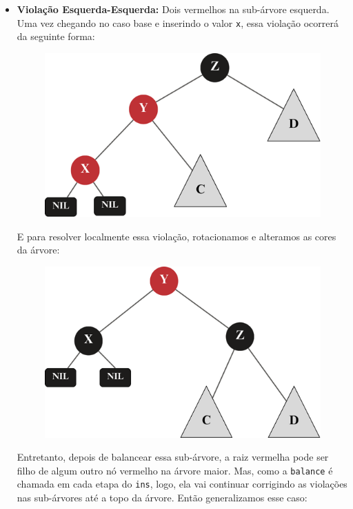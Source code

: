 \begin{itemize}
	\item \textbf{Violação Esquerda-Esquerda:} Dois vermelhos na sub-árvore esquerda. \\
	      Uma vez chegando no caso base e inserindo o valor \texttt{x}, essa violação ocorrerá da seguinte forma:
	      \begin{figure}[!ht]
		      \centering
		      \includegraphics[scale=0.5]{figures/rubro-negra/left-left-insertion.png}
		      \caption{}
	      \end{figure}
	      \FloatBarrier
	      E para resolver localmente essa violação, rotacionamos e alteramos as cores da árvore:
	      \begin{figure}[!ht]
		      \centering
		      \includegraphics[scale=0.5]{figures/rubro-negra/left-left-base-solution.png}
		      \caption{}
	      \end{figure}
	      \FloatBarrier
	      Entretanto, depois de balancear essa sub-árvore, a raiz vermelha pode ser filho de algum outro nó vermelho na árvore maior. Mas, como a \texttt{balance} é chamada em cada etapa do \texttt{ins}, logo, ela vai continuar corrigindo as violações nas sub-árvores até a topo da árvore. Então generalizamos esse caso:

\end{itemize}
